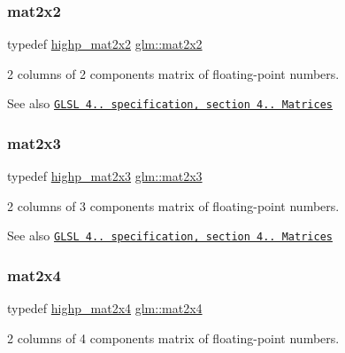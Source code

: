 \subsubsection{\texorpdfstring{mat2x2}{mat2x2}}
{\footnotesize\ttfamily typedef \mbox{\hyperlink{group__core__precision_gacdb012ddb9e783ed51b0ee009bf0d822}{highp\+\_\+mat2x2}} \mbox{\hyperlink{group__core__types_gaeddc14adb4963d9bad73866cc202fb40}{glm\+::mat2x2}}}

2 columns of 2 components matrix of floating-\/point numbers.

\begin{DoxySeeAlso}{See also}
\href{http://www.opengl.org/registry/doc/GLSLangSpec.4.20.8.pdf}{\tt G\+L\+SL 4.. specification, section 4.. Matrices} 
\end{DoxySeeAlso}
\mbox{\label{group__core__types_gaea02797b8231f6dd9380345f6ff12155}} 
\subsubsection{\texorpdfstring{mat2x3}{mat2x3}}
{\footnotesize\ttfamily typedef \mbox{\hyperlink{group__core__precision_ga9d61903aea75d6932829cd049f2e622a}{highp\+\_\+mat2x3}} \mbox{\hyperlink{group__core__types_gaea02797b8231f6dd9380345f6ff12155}{glm\+::mat2x3}}}

2 columns of 3 components matrix of floating-\/point numbers.

\begin{DoxySeeAlso}{See also}
\href{http://www.opengl.org/registry/doc/GLSLangSpec.4.20.8.pdf}{\tt G\+L\+SL 4.. specification, section 4.. Matrices} 
\end{DoxySeeAlso}
\mbox{\label{group__core__types_gaa9bfb36efaf88ecad32369ec8a01d901}} 
\subsubsection{\texorpdfstring{mat2x4}{mat2x4}}
{\footnotesize\ttfamily typedef \mbox{\hyperlink{group__core__precision_ga4ad5980b248b3d4dcf014db8fa4495cf}{highp\+\_\+mat2x4}} \mbox{\hyperlink{group__core__types_gaa9bfb36efaf88ecad32369ec8a01d901}{glm\+::mat2x4}}}

2 columns of 4 components matrix of floating-\/point numbers.

